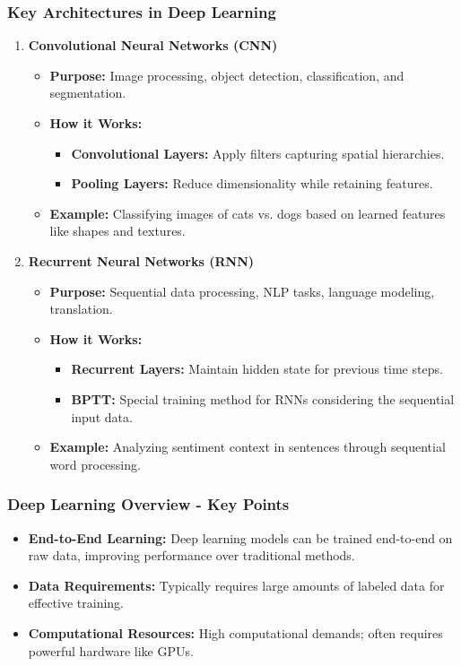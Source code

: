 \documentclass[aspectratio=169]{beamer}
\begin{document}
\begin{frame}[fragile]
    \frametitle{Key Architectures in Deep Learning}
    \begin{enumerate}
        \item \textbf{Convolutional Neural Networks (CNN)}
        \begin{itemize}
            \item \textbf{Purpose:} Image processing, object detection, classification, and segmentation.
            \item \textbf{How it Works:} 
            \begin{itemize}
                \item \textbf{Convolutional Layers:} Apply filters capturing spatial hierarchies.
                \item \textbf{Pooling Layers:} Reduce dimensionality while retaining features.
            \end{itemize}
            \item \textbf{Example:} Classifying images of cats vs. dogs based on learned features like shapes and textures.
        \end{itemize}
    
        \item \textbf{Recurrent Neural Networks (RNN)}
        \begin{itemize}
            \item \textbf{Purpose:} Sequential data processing, NLP tasks, language modeling, translation.
            \item \textbf{How it Works:}
            \begin{itemize}
                \item \textbf{Recurrent Layers:} Maintain hidden state for previous time steps.
                \item \textbf{BPTT:} Special training method for RNNs considering the sequential input data.
            \end{itemize}
            \item \textbf{Example:} Analyzing sentiment context in sentences through sequential word processing.
        \end{itemize}
    \end{enumerate}
\end{frame}

\begin{frame}[fragile]
    \frametitle{Deep Learning Overview - Key Points}
    \begin{itemize}
        \item \textbf{End-to-End Learning:} Deep learning models can be trained end-to-end on raw data, improving performance over traditional methods.
        \item \textbf{Data Requirements:} Typically requires large amounts of labeled data for effective training.
        \item \textbf{Computational Resources:} High computational demands; often requires powerful hardware like GPUs.
    \end{itemize}
\end{frame}
\end{document}

